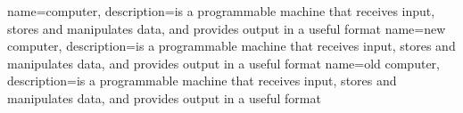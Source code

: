 {
  name=computer,
  description={is a programmable machine that receives input,
               stores and manipulates data, and provides
               output in a useful format}
}
{
  name=new computer,
  description={is a programmable machine that receives input,
               stores and manipulates data, and provides
               output in a useful format}
}
{
  name=old computer,
  description={is a programmable machine that receives input,
               stores and manipulates data, and provides
               output in a useful format}
}
